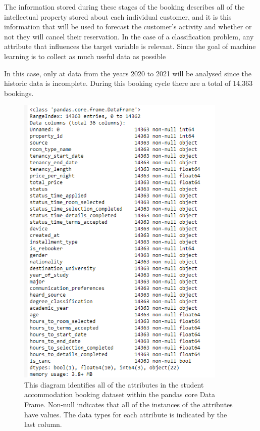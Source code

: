\vspace{5mm}

The information stored during these stages of the booking describes all of the intellectual property stored about each individual customer, and it is this information that will be used to forecast the customer's activity and whether or not they will cancel their reservation. In the case of a classification problem, any attribute that influences the target variable is relevant. Since the goal of machine learning is to collect as much useful data as possible

\vspace{5mm}

In this case, only at data from the years 2020 to 2021 will be analysed since the historic data is incomplete. During this booking cycle there are a total of 14,363 bookings.

\begin{figure}[H]
 \centering
 \includegraphics[width=10cm]{figures/df_info.png}
 \caption{This diagram identifies all of the attributes in the student accommodation booking dataset within the pandas core Data Frame. Non-null indicates that all of the instances of the attributes have values. The data types for each attribute is indicated by the last column. }
\end{figure}

